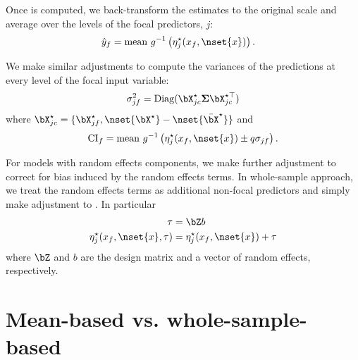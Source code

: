 Once  is computed, we back-transform the estimates to the original scale and average over the levels of the focal predictors, $j$:
%
\begin{align}\label{eq:pop_response} 
\hat{y}_f  &= \textrm{mean} ~ g^{-1} \left(\eta_j^\star(x_f, \nset{x})\right).
\end{align}
%

We make similar adjustments to compute the variances of the predictions at every level of the focal input variable:
%
\begin{align}
\sigma_{jf}^2 = \textrm{Diag}(\bX^\star_{jc} \boldsymbol{\Sigma} \bX^{\star\top}_{jc})
\end{align}
where $\bX^{\star}_{jc} = \{\bX_{jf}^\star, \nset{{\bX}^\star} - \nset{{\bar{\bX}}^\star}\}$ and 
%
\begin{align}
\mathrm{CI}_f = \mathrm{mean} ~ g^{-1} \left(\eta_j^\star(x_f, \nset{x}) \pm q\sigma_{jf}\right).
\end{align}
%

For models with random effects components, we make further adjustment to correct for bias induced by the random effects terms. In whole-sample approach, we treat the random effects terms as additional non-focal predictors and simply make adjustment to . In particular
%
\begin{align}\label{eq:pop_eta_re} 
\tau &= \bZ b \nonumber \\
\eta_j^\star(x_f, \nset{x}, \tau)  &= \eta_j^\star(x_f, \nset{x}) + \tau
\end{align}
where $\bZ$ and $b$ are the design matrix and a vector of random effects, respectively.

\section{Mean-based vs. whole-sample-based}

